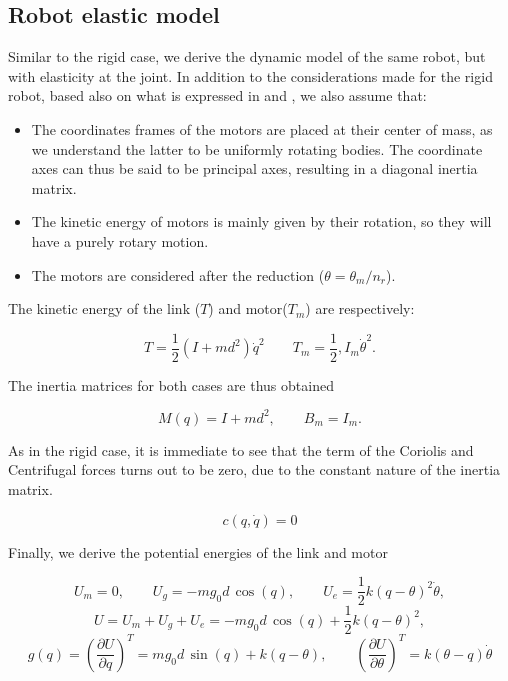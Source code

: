 \documentclass[a4paper]{article}
\begin{document}
\subsection{Robot elastic model}
Similar to the rigid case, we derive the dynamic model of the same robot, but with elasticity at the joint. In addition to the considerations made for the rigid robot, based also on what is expressed in \cite{sponge} and \cite{tomei}, we also assume that:

\begin{itemize}
    \item The coordinates frames of the motors are placed at their center of mass, as we understand the latter to be uniformly rotating bodies. The coordinate axes can thus be said to be principal axes, resulting in a diagonal inertia matrix.
    \item The kinetic energy of motors is mainly given by their rotation, so they will have a purely rotary motion.
    \item The motors are considered after the reduction ($\theta = \theta_m / n_r$). \\
\end{itemize}

The kinetic energy of the link ($T$) and motor($T_m$) are respectively:

\begin{equation}
    \nonumber
    T = \frac{1}{2} (I + md^2)\dot{q}^2 \qquad T_m = \frac{1}{2}, I_m \dot{\theta}^2.
\end{equation}

The inertia matrices for both cases are thus obtained

\begin{equation}
    \nonumber
    M(q) = I + md^2, \qquad B_m = I_m.
\end{equation}

As in the rigid case, it is immediate to see that the term of the Coriolis and Centrifugal forces turns out to be zero, due to the constant nature of the inertia matrix.

\begin{equation}
    \nonumber
    c(q,\dot{q}) = 0
\end{equation}

Finally, we derive the potential energies of the link and motor

\begin{equation}
    \nonumber
    U_m = 0, \qquad U_g = -mg_0d\, \cos(q), \qquad U_e = \frac{1}{2} k(q-\theta)^2 \dot{\theta},
\end{equation}
\begin{equation}
    \nonumber
    U = U_m + U_g + U_e = -mg_0d\, \cos(q) + \frac{1}{2}k(q-\theta)^2,
\end{equation}
\begin{equation}
    \nonumber
    g(q) = (\frac{\partial U}{\partial q})^T = mg_0d\, \sin(q) +k(q-\theta),\qquad (\frac{\partial U}{\partial \theta})^T = k(\theta - q) \dot{\theta}
\end{equation}
\end{document}
